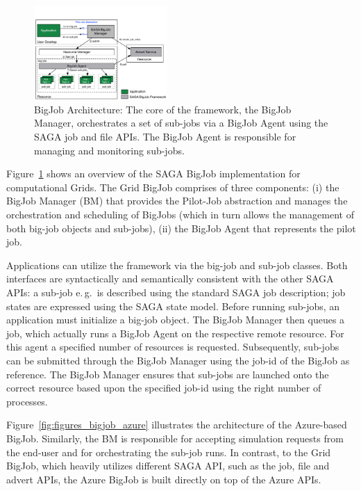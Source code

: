\documentclass[conference,final]{IEEEtran}
\newcommand{\up}{\vspace*{-1em}}
\begin{document}
\begin{figure}[ht]
    \centering
    \includegraphics[width=0.45\textwidth]{figures/bigjob}
   \caption{BigJob Architecture: The core of the framework, the
      BigJob Manager, orchestrates a set of sub-jobs via a
      BigJob Agent using the SAGA job and file APIs.  The
      BigJob Agent is responsible for managing and monitoring sub-jobs.\up}
   \label{fig:figures_bigjob}
\end{figure}
Figure~\ref{fig:figures_bigjob} shows an overview of the SAGA BigJob
implementation for computational Grids. The Grid BigJob comprises of
three components: (i) the BigJob Manager (BM) that provides the Pilot-Job
abstraction and manages the orchestration and scheduling of BigJobs
(which in turn allows the management of both big-job objects and
sub-jobs), (ii) the BigJob Agent that represents the pilot job.


Applications can utilize the framework via the big-job and sub-job
classes. Both interfaces are syntactically and semantically consistent
with the other SAGA APIs: a sub-job e.\,g.\ is described using 
the standard SAGA job description; job states are expressed
using the SAGA state model. Before running sub-jobs, an application must initialize
a big-job object. The BigJob Manager then queues a job,
which actually runs a BigJob Agent on the respective remote
resource. For this agent a specified number of resources is
requested. Subsequently, sub-jobs can be submitted through the BigJob
Manager using the job-id of the BigJob as reference. The BigJob
Manager ensures that sub-jobs are launched onto the correct
resource based upon the specified job-id using the right number of
processes. 


Figure~\ref{fig:figures_bigjob_azure} illustrates the architecture of 
the Azure-based BigJob. Similarly, the BM is responsible for accepting 
simulation requests from the end-user and for orchestrating the sub-job runs. 
In contrast, to the Grid BigJob, which heavily utilizes different SAGA API,
such as the job, file and advert APIs, the Azure BigJob is built directly 
on top of the Azure APIs. 
\end{document}
